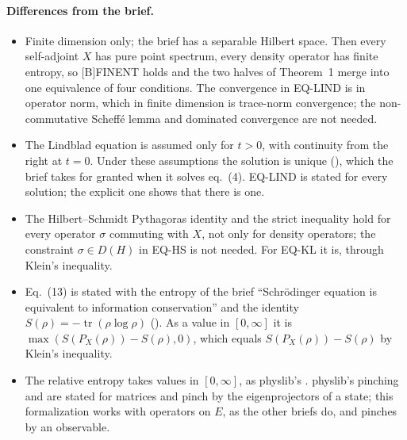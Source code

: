 \documentclass[11pt]{article}
\begin{document}
\paragraph{Differences from the brief.}
\begin{itemize}
\item Finite dimension only; the brief has a separable Hilbert space. Then every self-adjoint $X$
  has pure point spectrum, every density operator has finite entropy, so [B]FINENT holds and
  the two halves of Theorem~1 merge into one equivalence of four conditions. The convergence in
  EQ-LIND is in operator norm, which in finite dimension is trace-norm convergence; the
  non-commutative Scheff\'e lemma and dominated convergence are not needed.
\item The Lindblad equation is assumed only for $t > 0$, with continuity from the right at
  $t = 0$. Under these assumptions the solution is unique (), which the brief
  takes for granted when it solves eq.~(4). EQ-LIND is stated for every solution; the explicit
  one shows that there is one.
\item The Hilbert--Schmidt Pythagoras identity and the strict inequality hold for every operator
  $\sigma$ commuting with $X$, not only for density operators; the constraint $\sigma \in D(H)$ in
  EQ-HS is not needed. For EQ-KL it is, through Klein's inequality.
\item Eq.~(13) is stated with the entropy  of the brief ``Schr\"odinger equation
  is equivalent to information conservation'' and the identity
  $S(\rho) = -\operatorname{tr}(\rho\log\rho)$ (). As a value in
  $[0, \infty]$ it is $\max(S(P_X(\rho)) - S(\rho), 0)$, which equals $S(P_X(\rho)) - S(\rho)$ by
  Klein's inequality.
\item The relative entropy takes values in $[0, \infty]$, as physlib's .
  physlib's pinching and  are stated for matrices and pinch by the
  eigenprojectors of a state; this formalization works with operators on $E$, as the other
  briefs do, and pinches by an observable.
\end{itemize}
\end{document}
